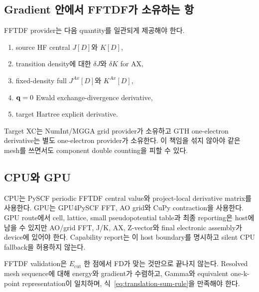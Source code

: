 \subsection{Gradient 안에서 FFTDF가 소유하는 항}

FFTDF provider는 다음 quantity를 일관되게 제공해야 한다.

\begin{enumerate}
  \item source HF central $J[D]$와 $K[D]$,
  \item transition density에 대한 $\delta J$와 $\delta K$ for AX,
  \item fixed-density full $J^{Ax}[D]$와 $K^{Ax}[D]$,
  \item $\mathbf{q}=0$ Ewald exchange-divergence derivative,
  \item target Hartree explicit derivative.
\end{enumerate}

Target XC는 NumInt/MGGA grid provider가 소유하고 GTH one-electron derivative는 별도
one-electron provider가 소유한다. 이 책임을 섞지 않아야 같은 mesh를 쓰면서도 component
double counting을 피할 수 있다.

\subsection{CPU와 GPU}

CPU는 PySCF periodic FFTDF central value와 project-local derivative matrix를 사용한다.
GPU는 GPU4PySCF FFT, AO grid와 CuPy contraction을 사용한다. GPU route에서 cell, lattice,
small pseudopotential table과 최종 reporting은 host에 남을 수 있지만 AO/grid FFT,
J/K, AX, Z-vector와 final electronic assembly가 device에 있어야 한다. Capability report는
이 host boundary를 명시하고 silent CPU fallback을 허용하지 않는다.

FFTDF validation은 $E_{\mathrm{cut}}$ 한 점에서 FD가 맞는 것만으로 끝나지 않는다.
Resolved mesh sequence에 대해 energy와 gradient가 수렴하고, Gamma와 equivalent one-k-point
representation이 일치하며, 식~\eqref{eq:translation-sum-rule}을 만족해야 한다.
